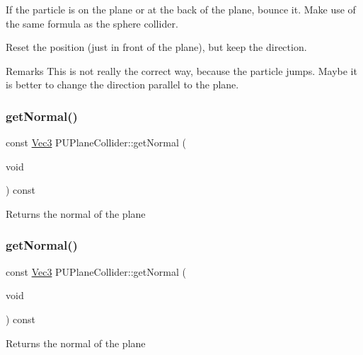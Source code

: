 If the particle is on the plane or at the back of the plane, bounce it. Make use of the same formula as the sphere collider.

Reset the position (just in front of the plane), but keep the direction. \begin{DoxyRemark}{Remarks}
This is not really the correct way, because the particle \textquotesingle{}jumps\textquotesingle{}. Maybe it is better to change the direction parallel to the plane.
\end{DoxyRemark}
\mbox{\label{classPUPlaneCollider_a879ccfbdc354faaf0390c28470739e74}} 
\subsubsection{\texorpdfstring{get\+Normal()}{getNormal()}\hspace{0.1cm}{\footnotesize\ttfamily [1/2]}}
{\footnotesize\ttfamily const \hyperlink{classVec3}{Vec3} P\+U\+Plane\+Collider\+::get\+Normal (\begin{DoxyParamCaption}\item[{void}]{ }\end{DoxyParamCaption}) const}

Returns the normal of the plane \mbox{\label{classPUPlaneCollider_a879ccfbdc354faaf0390c28470739e74}} 
\subsubsection{\texorpdfstring{get\+Normal()}{getNormal()}\hspace{0.1cm}{\footnotesize\ttfamily [2/2]}}
{\footnotesize\ttfamily const \hyperlink{classVec3}{Vec3} P\+U\+Plane\+Collider\+::get\+Normal (\begin{DoxyParamCaption}\item[{void}]{ }\end{DoxyParamCaption}) const}

Returns the normal of the plane \mbox{\label{classPUPlaneCollider_a527e29896ed1c6a741dad6225ba650b5}} 
